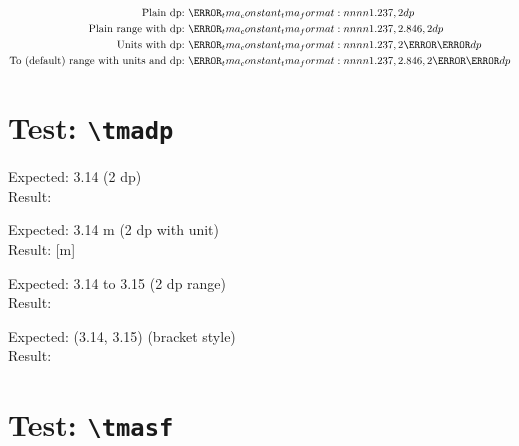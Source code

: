 \documentclass[a4paper,12pt]{article}
\begin{document}
\begin{align*}
    \text{Plain dp:} &~ \tmadp{1.237, 2}\\
    \text{Plain range with dp:} &~ \tmadp{1.237, 2.846, 2}\\
    \text{Units with dp:} &~ \tmadp{1.237, 2}[\centi\metre]\\
    \text{To (default) range with units and dp:} &~ \tmadp{1.237, 2.846, 2}[\kilo\gram]\\
\end{align*}

\iffalse
\section*{Test: \texttt{\textbackslash tmasf} in maths mode}

\begin{align*}
    \text{Plain sf(3):} &~ \tmasf{1.237, 3}\\
    \text{Plain sf(2):} &~ \tmasf{1.237,2}\\
    \text{Units with sf:} &~ \tmasf{1.237, 2}[\centi\metre]\\
    \text{To range with units and sf:} &~ \tmasf[style=to]{-1.393, 0.615, 3}[\gram]\\
    \text{Bracket range with sf:} &~ \tmasf[style=bracket]{-1.393, 0.615, 2}\\
    \text{To range with units and sf:} &~ \tmasf[style=to]{-1.393, 0.615, 3}[\metre\per\second]
\end{align*}
\fi

\section*{Test: \texttt{\textbackslash tmadp}}

Expected: 3.14 (2 dp) \\
Result: 

Expected: 3.14 m (2 dp with unit) \\
Result: [m]

Expected: 3.14 to 3.15 (2 dp range) \\
Result: 

Expected: (3.14, 3.15) (bracket style) \\
Result: 

\section*{Test: \texttt{\textbackslash tmasf}}
\end{document}
